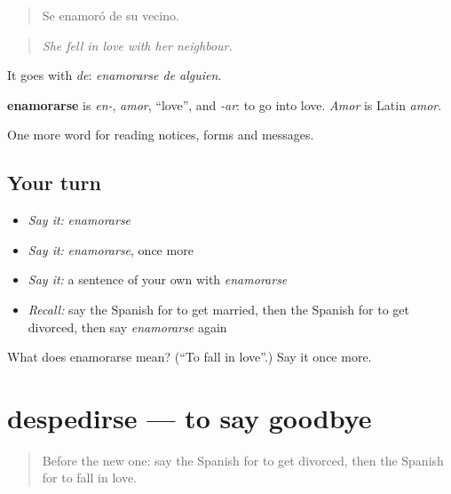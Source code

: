 \begin{quote}
Se enamoró de su vecino.
\end{quote}

\begin{quote}
\emph{She fell in love with her neighbour.}
\end{quote}

It goes with \emph{de}: \emph{enamorarse de alguien}.

\begin{cousinweb}
\textbf{enamorarse} is \emph{en-}, \emph{amor}, \textquotedblleft{}love\textquotedblright{}, and \emph{-ar}: to go into love. \emph{Amor} is Latin \emph{amor}.
\end{cousinweb}

\begin{grammarlens}[title={What you've built}]
One more word for reading notices, forms and messages.
\end{grammarlens}

\subsection*{Your turn}
\begin{itemize}
\raggedright
  \item \emph{Say it:} \emph{enamorarse}
  \item \emph{Say it:} \emph{enamorarse}, once more
  \item \emph{Say it:} a sentence of your own with \emph{enamorarse}
  \item \emph{Recall:} say the Spanish for to get married, then the Spanish for to get divorced, then say \emph{enamorarse} again
\end{itemize}

\begin{tcolorbox}[breakable,colback=teal!4,colframe=teal!35!black,title={Before you move on}]
What does enamorarse mean? (\textquotedblleft{}To fall in love\textquotedblright{}.) Say it once more.
\end{tcolorbox}
\section[despedirse]{despedirse — to say goodbye}

\label{lesson:ES-C488-despedirse}



\begin{quote}
Before the new one: say the Spanish for to get divorced, then the Spanish for to fall in love.
\end{quote}

